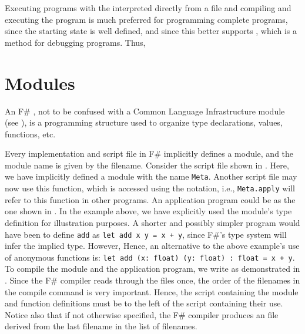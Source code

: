 \documentclass[fsharpNotes.tex]{subfiles}
\begin{document}
Executing programs with the interpreted directly from a file and compiling and executing the program is much preferred for programming complete programs, since the starting state is well defined, and since this better supports , which is a method for debugging programs. Thus, %



\section{Modules}
\label{sec:modules}
An F\# , not to be confused with a Common Language Infrastructure module (see ), is a programming structure used to organize type declarations, values, functions, etc. 

Every implementation and script file in F\# implicitly defines a module, and the module name is given by the filename. Consider the script file  shown in .
%
%
Here, we have implicitly defined a module with the name \lstinline{Meta}. Another script file may now use this function, which is accessed using the  notation, i.e., \lstinline{Meta.apply} will refer to this function in other programs. An application program could be as the one shown in .
%
%
In the example above, we have explicitly used the module's type definition for illustration purposes. A shorter and possibly simpler program would have been to define \lstinline{add} as \lstinline{let add x y = x + y}, since F\#'s type system will infer the implied type. However,  Hence, an alternative to the above example's use of anonymous functions is: \lstinline{let add (x: float) (y: float) : float = x + y}. To compile the module and the application program, we write as demonstrated in .
%
%
Since the F\# compiler reads through the files once, the order of the filenames in the compile command is very important. Hence, the script containing the module and function definitions must be to the left of the script containing their use. Notice also that if not otherwise specified, the F\# compiler produces an  file derived from the last filename in the list of filenames.
\end{document}
